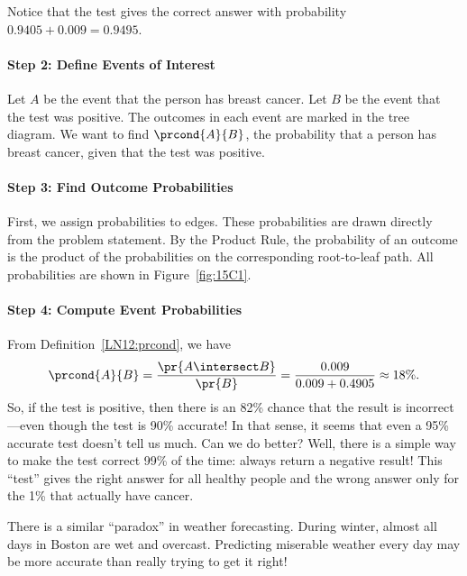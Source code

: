Notice that the test gives the correct answer with probability $0.9405
+ 0.009 = 0.9495$.

\paragraph{Step 2: Define Events of Interest}

Let $A$ be the event that the person has breast cancer.  Let $B$ be the
event that the test was positive.  The outcomes in each event are marked
in the tree diagram.  We want to find $\prcond{A}{B}$, the probability
that a person has breast cancer, given that the test was positive.

\paragraph{Step 3: Find Outcome Probabilities}

First, we assign probabilities to edges.  These probabilities are
drawn directly from the problem statement.  By the Product Rule, the
probability of an outcome is the product of the probabilities on the
corresponding root-to-leaf path.  All probabilities are shown in
Figure~\ref{fig:15C1}.

\paragraph{Step 4: Compute Event Probabilities}

From Definition~\ref{LN12:prcond}, we have
\begin{equation*}
\prcond{A}{B}	= \frac{\pr{A \intersect B}}{\pr{B}} %
		= \frac{0.009}{0.009 + 0.4905} %
		\approx 18\%.
\end{equation*}
So, if the test is positive, then there is an 82\% chance that the
result is incorrect---even though the test is 90\% accurate!  In that
sense, it seems that even a 95\% accurate test doesn't tell us much.  Can we
do better?  Well, there is a simple way to make the test correct 99\%
of the time: always return a negative result!  This ``test'' gives the
right answer for all healthy people and the wrong answer only for the
1\% that actually have cancer.


\begin{editingnotes}
There is a similar ``paradox'' in weather forecasting.  During winter,
almost all days in Boston are wet and overcast.  Predicting miserable
weather every day may be more accurate than really trying to get it
right!
\end{editingnotes}


